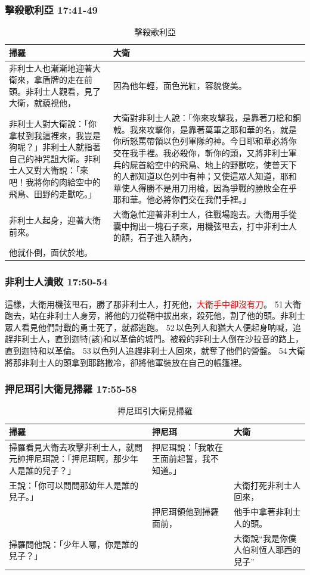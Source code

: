 \subsubsection{擊殺歌利亞 17:41-49}
\begin{table}[H]
\centering 
\begin{tabular}{p{7cm}|p{}}\hline\hline
掃羅&大衛\\\hline
非利士人也漸漸地迎著大衛來，拿盾牌的走在前頭。非利士人觀看，見了大衛，就藐視他，&因為他年輕，面色光紅，容貌俊美。\\\hline
非利士人對大衛說：「你拿杖到我這裡來，我豈是狗呢？」非利士人就指著自己的神咒詛大衛。非利士人又對大衛說：「來吧！我將你的肉給空中的飛鳥、田野的走獸吃。」
&大衛對非利士人說：「你來攻擊我，是靠著刀槍和銅戟。我來攻擊你，是靠著萬軍之耶和華的名，就是你所怒罵帶領以色列軍隊的神。今日耶和華必將你交在我手裡。我必殺你，斬你的頭，又將非利士軍兵的屍首給空中的飛鳥、地上的野獸吃，使普天下的人都知道以色列中有神；又使這眾人知道，耶和華使人得勝不是用刀用槍，因為爭戰的勝敗全在乎耶和華。他必將你們交在我們手裡。」 \\\hline
非利士人起身，迎著大衛前來。&大衛急忙迎著非利士人，往戰場跑去。大衛用手從囊中掏出一塊石子來，用機弦甩去，打中非利士人的額，石子進入額內，\\\hline
他就仆倒，面伏於地。&\\\hline
\end{tabular}
\caption{擊殺歌利亞}
\end{table}
 
\subsubsection{非利士人潰敗 17:50-54}
這樣，大衛用機弦甩石，勝了那非利士人，打死他，\textcolor{red}{大衛手中卻沒有刀}。 51 大衛跑去，站在非利士人身旁，將他的刀從鞘中拔出來，殺死他，割了他的頭。非利士眾人看見他們討戰的勇士死了，就都逃跑。 52 以色列人和猶大人便起身呐喊，追趕非利士人，直到迦特(該)和以革倫的城門。被殺的非利士人倒在沙拉音的路上，直到迦特和以革倫。 53 以色列人追趕非利士人回來，就奪了他們的營盤。 54 大衛將那非利士人的頭拿到耶路撒冷，卻將他軍裝放在自己的帳篷裡。

\subsubsection{押尼珥引大衛見掃羅 17:55-58}
\begin{table}[H]
\centering 
\begin{tabular}{p{7cm}|p{3.7cm}|p{6.5cm}}\hline\hline
掃羅&押尼珥&大衛\\\hline
掃羅看見大衛去攻擊非利士人，就問元帥押尼珥說：「押尼珥啊，那少年人是誰的兒子？」&押尼珥說：「我敢在王面前起誓，我不知道。」& \\\hline
王說：「你可以問問那幼年人是誰的兒子。」&&大衛打死非利士人回來， \\\hline
&押尼珥領他到掃羅面前，&他手中拿著非利士人的頭。  \\\hline
掃羅問他說：「少年人哪，你是誰的兒子？」&&大衛說“我是你僕人伯利恆人耶西的兒子”\\\hline
\end{tabular}
\caption{押尼珥引大衛見掃羅}
\end{table}


